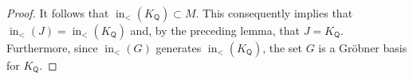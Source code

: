 \documentclass[10pt]{amsart}
\numberwithin{equation}{section}
\theoremstyle{definition}
\theoremstyle{remark}
\renewcommand{\L}{\mathcal{L}}%
\DeclareMathOperator{\In}{\mathrm{in}}
\newcommand{\1}{^{-1}}
\def\ZZ{\mathbb{Z}}
\def\Q{\mathsf{Q}}
\begin{document}
\begin{proof}
It follows that $\In_<(K_\Q)\subset M$.  This consequently implies that $\In_<(J)=\In_<(K_\Q)$ and, by the preceding lemma, that $J=K_\Q$.  Furthermore, since $\In_<(G)$ generates $\In_<(K_\Q)$, the set $G$ is a Gr\"obner basis for $K_\Q$.
%
%
%

\end{proof}
\end{document}
